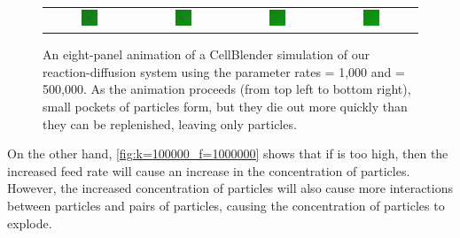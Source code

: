 \begin{figure}[h]
\begin{tabular}{c c c c}
\includegraphics[width = 0.2\textwidth]{../images/predator_prey_predator_dies_f1e1_r5e5_i4.png} & \includegraphics[width = 0.2\textwidth]{../images/../images/predator_prey_predator_dies_f1e1_r5e5_i5.png} & \includegraphics[width = 0.2\textwidth]{../images/../images/predator_prey_predator_dies_f1e1_r5e5_i6.png} & \includegraphics[width = 0.2\textwidth]{../images/../images/predator_prey_predator_dies_f1e1_r5e5_i7.png}
\end{tabular}
\caption{An eight-panel animation of a CellBlender simulation of our reaction-diffusion system using the parameter rates  = 1,000 and  = 500,000. As the animation proceeds (from top left to bottom right), small pockets of  particles form, but they die out more quickly than they can be replenished, leaving only  particles.}
\label{fig:k=500000_f=1000}
\end{figure}

On the other hand, \autoref{fig:k=100000_f=1000000} shows that if  is too high, then the increased feed rate will cause an increase in the concentration of  particles. However, the increased concentration of  particles will also cause more interactions between  particles and pairs of  particles, causing the concentration of  particles to explode.

